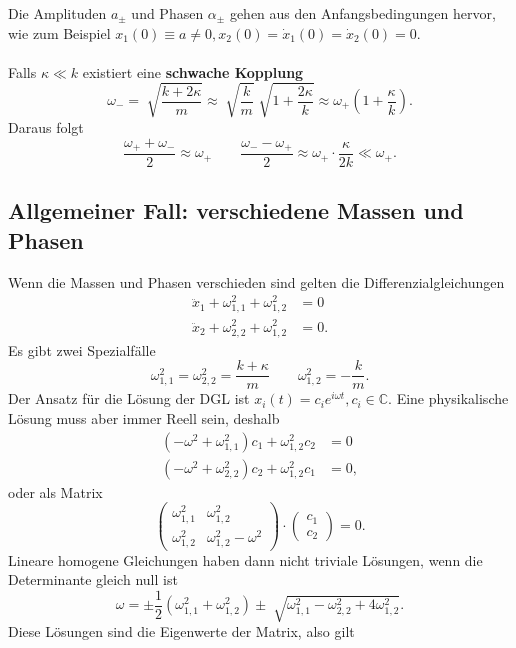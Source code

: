 \documentclass[a4paper,12pt]{article}
\numberwithin{equation}{section}
\begin{document}
Die Amplituden $a_{\pm}$ und Phasen $\alpha _{\pm}$ gehen aus den Anfangsbedingungen hervor, wie zum Beispiel $x_1(0)\equiv a\neq 0,x_2(0)=\dot{x}_1(0)=\dot{x}_2(0)=0$.\\\\
Falls $\kappa \ll k$ existiert eine \textbf{schwache Kopplung}
\[ 
        \omega _-=\sqrt[]{\dfrac{k+2\kappa }{m}}\approx \sqrt[]{\dfrac{k}{m}}\sqrt[]{1+\dfrac{2\kappa }{k}}\approx \omega _+\left(1+\dfrac{\kappa }{k}\right)
.\] 
Daraus folgt
\[ 
        \dfrac{\omega _++\omega _-}{2}\approx \omega _+\qquad \dfrac{\omega _--\omega _+}{2}\approx \omega _+\cdot \dfrac{\kappa }{2k}\ll \omega _+
.\] 

\subsection{Allgemeiner Fall: verschiedene Massen und Phasen}
Wenn die Massen und Phasen verschieden sind gelten die Differenzialgleichungen
\begin{align*}
        \ddot{x}_1+\omega ^2_{1,1}+\omega ^2_{1,2}&=0\\
        \ddot{x}_2+\omega ^2_{2,2}+\omega ^2_{1,2}&=0
.\end{align*}
Es gibt zwei Spezialfälle
\[ 
        \omega ^2_{1,1}=\omega ^2_{2,2}=\dfrac{k+\kappa }{m}\qquad \omega ^2_{1,2}=-\dfrac{k}{m}
.\] 
Der Ansatz für die Lösung der DGL ist $x_i(t)=c_ie^{i\omega t},c_i \in \mathbb{C}$. Eine physikalische Lösung muss aber immer Reell sein, deshalb
\begin{align*}
        \left(-\omega ^2+\omega ^2_{1,1}\right)c_1+\omega ^2_{1,2}c_2&=0\\
        \left(-\omega ^2+\omega ^2_{2,2}\right)c_2+\omega ^2_{1,2}c_1&=0
,\end{align*}
oder als Matrix
\[ 
        \left(\begin{matrix}
                        \omega ^2_{1,1}&\omega ^2_{1,2}\\\omega ^2_{1,2}&\omega ^2_{1,2}-\omega ^2
        \end{matrix}\right)\cdot \left(\begin{matrix}
                c_1\\c_2
        \end{matrix}\right)=0
.\] 
Lineare homogene Gleichungen haben dann nicht triviale Lösungen, wenn die Determinante gleich null ist
\[ 
        \omega =\pm\dfrac{1}{2}\left(\omega ^2_{1,1}+\omega ^2_{1,2}\right)\pm \sqrt[]{\omega ^2_{1,1}-\omega ^2_{2,2}+4\omega ^2_{1,2}}
.\] 
Diese Lösungen sind die Eigenwerte der Matrix, also gilt
\end{document}
